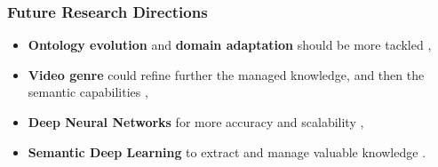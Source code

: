 \begin{frame}
	\frametitle{Future Research Directions}
	
	\begin{alertblock}{}
		\begin{itemize}
		\item \textbf{Ontology evolution} and \textbf{domain adaptation} should be more tackled 
 		{\tiny{\citep{Hoffman2014,Liu2016}}},
		
		\item \textbf{Video genre} could refine further the managed knowledge, 
		and then the semantic capabilities
 		{\tiny{\citep{Wu2012, Huang2012, Chattopadhyay2013, Muneesawang2014}}},
		
		\item \textbf{Deep Neural Networks} for more \alert{accuracy} and \alert{scalability}
		{\tiny{\citep{Wu2015,Druzhkov2016}}},
		
		\item \textbf{Semantic Deep Learning} to extract and manage valuable knowledge
		{\tiny{\citep{Wang2015SemanticDL}}}.
		\end{itemize}
	\end{alertblock}
\end{frame}
